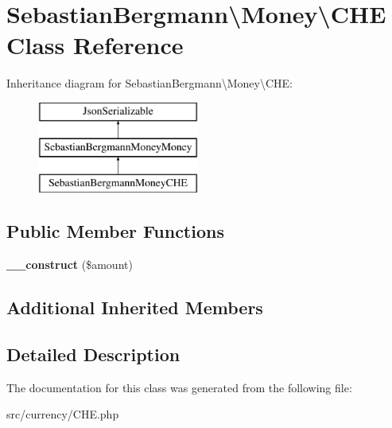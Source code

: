 \hypertarget{classSebastianBergmann_1_1Money_1_1CHE}{}\section{Sebastian\+Bergmann\textbackslash{}Money\textbackslash{}C\+H\+E Class Reference}
\label{classSebastianBergmann_1_1Money_1_1CHE}
Inheritance diagram for Sebastian\+Bergmann\textbackslash{}Money\textbackslash{}C\+H\+E\+:\begin{figure}[H]
\begin{center}
\leavevmode
\includegraphics[height=3.000000cm]{classSebastianBergmann_1_1Money_1_1CHE}
\end{center}
\end{figure}
\subsection*{Public Member Functions}
\begin{DoxyCompactItemize}
\item 
\hypertarget{classSebastianBergmann_1_1Money_1_1CHE_a60347f9b0684fea277de39fb93a092e5}{}{\bfseries \+\_\+\+\_\+construct} (\$amount)\label{classSebastianBergmann_1_1Money_1_1CHE_a60347f9b0684fea277de39fb93a092e5}

\end{DoxyCompactItemize}
\subsection*{Additional Inherited Members}


\subsection{Detailed Description}


The documentation for this class was generated from the following file\+:\begin{DoxyCompactItemize}
\item 
src/currency/C\+H\+E.\+php\end{DoxyCompactItemize}
